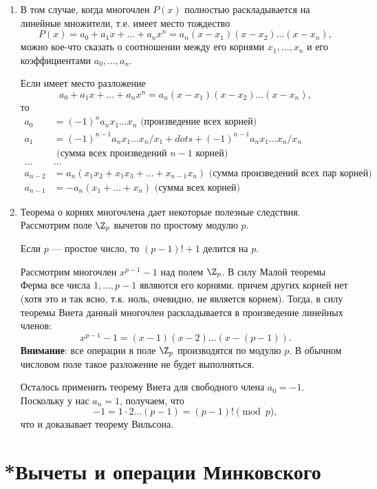 \begin{enumerate}
\item В том случае, когда многочлен $P(x)$ полностью раскладывается на линейные множители, т.е. имеет место тождество
$$
P(x)=a_0+a_1x+\dots+a_nx^n = a_n(x-x_1)(x-x_2)\dots(x-x_n),
$$
можно кое-что сказать о соотношении между его корнями $x_1,\dots,x_n$ и его коэффициентами $a_0,\dots,a_n$.
\begin{thrm}[Виета]
Если имеет место разложение
$$
a_0+a_1x+\dots+a_nx^n = a_n(x-x_1)(x-x_2)\dots(x-x_n),
$$
то
\begin{align*}
a_0 & = (-1)^na_nx_1\dots x_n\mbox{  (произведение всех корней)} \\
a_1 & = (-1)^{n-1}a_nx_1\dots x_n/x_1+dots+(-1)^{n-1}a_nx_1\dots x_n/x_n \\
    & \mbox{  (сумма всех произведений $n-1$ корней)} \\
\dots & \dots \\
a_{n-2} & = a_n(x_1x_2+x_1x_3+\dots + x_{n-1}x_n)\mbox{  (сумма произведений всех пар корней)} \\
a_{n-1} & = -a_n(x_1+\dots+x_n) \mbox{  (сумма всех корней)}
\end{align*}
\end{thrm}

\item Теорема о корнях многочлена дает некоторые полезные следствия. Рассмотрим поле $\Z_p$ вычетов по простому модулю $p$.
\begin{thrm}[Вильсона]\label{Wilson}
Если $p$ --- простое число, то $(p-1)!+1$ делится на $p$.
\end{thrm}
\pf
Рассмотрим многочлен $x^{p-1}-1$ над полем $\Z_p$. В силу Малой теоремы Ферма все числа $1,\dots,p-1$ являются его корнями. причем других корней нет (хотя это и так ясно, т.к. ноль, очевидно, не является корнем). Тогда, в силу теоремы Виета данный многочлен раскладывается в произведение линейных членов:
$$
x^{p-1}-1 = (x-1)(x-2)\dots (x-(p-1)).
$$
\textbf{Внимание}: все операции в поле $\Z_p$ производятся по модулю $p$. В обычном числовом поле такое разложение не будет выполняться.

Осталось применить теорему Виета для свободного члена $a_0=-1$. Поскольку у нас $a_n=1$, получаем, что
$$
-1=1\cdot 2\dots(p-1)=(p-1)!\pmod p,
$$
что и доказывает теорему Вильсона.
\epf
\end{enumerate}


\section{*Вычеты и операции Минковского}\label{Faktor}


